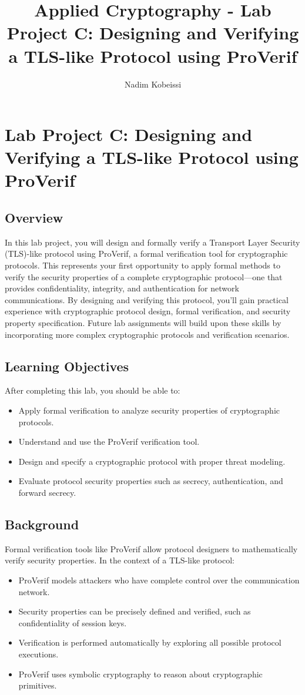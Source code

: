 \documentclass[10pt,a4paper,american]{article}
\title{Applied Cryptography - Lab Project C: Designing and Verifying a TLS-like Protocol using ProVerif}
\author{Nadim Kobeissi}
\begin{document}
\classhandoutheader
\section*{Lab Project C: Designing and Verifying a TLS-like Protocol using ProVerif}

\subsection*{Overview}
In this lab project, you will design and formally verify a Transport Layer Security (TLS)-like protocol using ProVerif, a formal verification tool for cryptographic protocols. This represents your first opportunity to apply formal methods to verify the security properties of a complete cryptographic protocol—one that provides confidentiality, integrity, and authentication for network communications. By designing and verifying this protocol, you'll gain practical experience with cryptographic protocol design, formal verification, and security property specification. Future lab assignments will build upon these skills by incorporating more complex cryptographic protocols and verification scenarios.

\subsection*{Learning Objectives}
After completing this lab, you should be able to:
\begin{itemize}
	\item Apply formal verification to analyze security properties of cryptographic protocols.
	\item Understand and use the ProVerif verification tool.
	\item Design and specify a cryptographic protocol with proper threat modeling.
	\item Evaluate protocol security properties such as secrecy, authentication, and forward secrecy.
\end{itemize}

\subsection*{Background}
Formal verification tools like ProVerif allow protocol designers to mathematically verify security properties. In the context of a TLS-like protocol:
\begin{itemize}
	\item ProVerif models attackers who have complete control over the communication network.
	\item Security properties can be precisely defined and verified, such as confidentiality of session keys.
	\item Verification is performed automatically by exploring all possible protocol executions.
	\item ProVerif uses symbolic cryptography to reason about cryptographic primitives.
\end{itemize}
\end{document}
